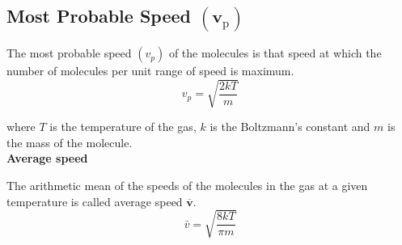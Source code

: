 \subsection{Most Probable Speed $\left(\mathbf{v}_{\mathrm{p}}\right)$}

The most probable speed $\left(v_{p}\right)$ of the molecules is that speed at which the number of molecules per unit range of speed is maximum.
\begin{equation}
v_{p}=\sqrt{\frac{2 k T}{m}}\label{SME-21}
\end{equation}
\par where $T$ is the temperature of the gas, $k$ is the Boltzmann's constant and $m$ is the mass of the molecule.\\
\textbf{Average speed}
\par The arithmetic mean of the speeds of the molecules in the gas at a given temperature is called average speed $\overline{\mathbf{v}}$.
\begin{equation}
\bar{v}=\sqrt{\frac{8 k T}{\pi m}}\label{SME-22}
\end{equation}
